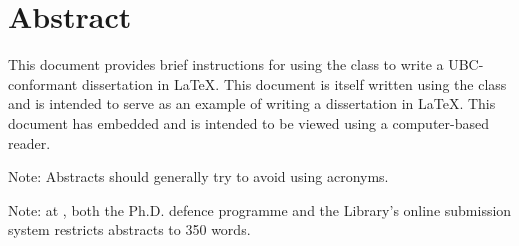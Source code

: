 
\chapter{Abstract}

This document provides brief instructions for using the 
class to write a \acs{UBC}-conformant dissertation in \LaTeX.  This
document is itself written using the  class and is
intended to serve as an example of writing a dissertation in \LaTeX.
This document has embedded  and is intended to be viewed
using a computer-based  reader.

Note: Abstracts should generally try to avoid using acronyms.

Note: at , both the  Ph.D. defence programme and the
Library's online submission system restricts abstracts to 350
words.

